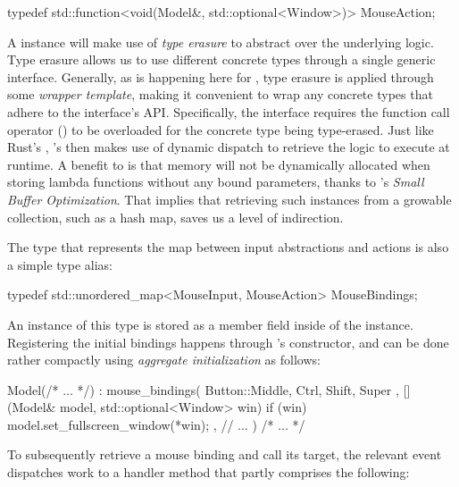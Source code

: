 \begin{cppblock}
  typedef
    std::function<void(Model&, std::optional<Window>)>
    MouseAction;
\end{cppblock}

A  instance will make use of \textit{type erasure}
to abstract over the underlying logic\cite{cppstd, typeerasure}. Type
erasure allows us to use different concrete types through a single
generic interface\cite{typeerasure}. Generally, as is happening here for
, type erasure is applied through some \textit{wrapper
template}, making it convenient to wrap any concrete types that adhere to the
interface's API\cite{typeerasure}. Specifically, the 
interface requires the function call operator () to be
overloaded for the concrete type being type-erased\cite{cppstd, typeerasure}.
Just like Rust's , \cpp{}'s  then makes use
of dynamic dispatch to retrieve the logic to execute at runtime. A benefit to
 is that memory will not be dynamically allocated when
storing lambda functions without any bound parameters, thanks to \cpp{}'s
\textit{Small Buffer Optimization}\cite{commonoptimizations, underhoodfunction}.
That implies that retrieving such instances from a growable collection, such as
a hash map, saves us a level of indirection.

The  type that represents the map between input
abstractions and actions is also a simple type alias:

\begin{cppblock}
  typedef
    std::unordered_map<MouseInput, MouseAction>
    MouseBindings;
\end{cppblock}

An instance of this type is stored as a member field inside of the 
instance. Registering the initial bindings happens through 's
constructor, and can be done rather compactly using \textit{aggregate
initialization} as follows\cite{cppstd}:

\begin{cppblock}
  Model(/* ... */)
    : mouse_bindings({
      { { Button::Middle, { Ctrl, Shift, Super } },
        [](Model& model, std::optional<Window> win) {
          if (win) model.set_fullscreen_window(*win);
        }
      },
      // ...
    })
  { /* ... */ }
\end{cppblock}

To subsequently retrieve a mouse binding and call its target, the relevant
 event dispatches work to a handler method that partly
comprises the following:

